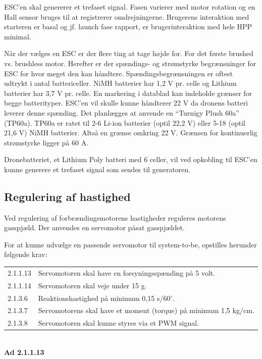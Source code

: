 ESC'en skal genererer et trefaset signal. Fasen varierer med motor rotation og en Hall sensor bruges til at registrerer omdrejningerne. Brugerens interaktion med starteren er basal og jf. launch fase rapport, er brugerinteraktion med hele HPP minimal.

Når der vælges en ESC er der flere ting at tage højde for. For det første brushed vs. brushless motor. Herefter er der spændings- og strømstyrke begrænsninger for ESC for hvor meget den kan håndtere. Spændingsbegrænsningen er oftest udtrykt i antal battericeller. NiMH batterier har 1,2 V pr. celle og Lithium batterier har 3,7 V pr. celle. En markering i datablad kan indeholde grænser for begge batterityper. ESC'en vil skulle kunne håndterer 22 V da dronens batteri leverer denne spænding. Det planlægges at anvende  en ``Turnigy Plush 60a'' (TP60a). TP60a er ratet til 2-6 Li-ion batterier (optil 22,2 V) eller 5-18 (optil 21,6 V) NiMH batterier. Altså en grænse omkring 22 V. Grænsen for kontinuerlig strømstyrke ligger på 60 A.

Dronebatteriet, et Lithium Poly batteri med 6 celler, vil ved opkobling til ESC'en kunne generere et trefaset signal som sendes til generatoren.

\subsection{Regulering af hastighed}
\label{sec:regul-af-hast}

Ved regulering af forbrændingsmotorens hastigheder reguleres motorens gasspjæld. Der anvendes en servomotor påsat gasspjældet.

For at kunne udvælge en passende servomotor til system-to-be, opstilles herunder følgende krav:
\vspace{1em}
\begin{tabular}[h]{ll}
2.1.1.13&Servomotoren skal have en forsyningsspænding på 5 volt.\vspace{0.5em}\\
2.1.1.14&Servomotoren skal veje under 15 g.\vspace{0.5em}\\
2.1.3.6 &Reaktionshastighed på minimum 0,15 s/60$^\circ$.\vspace{0.5em}\\
2.1.3.7& Servomotorens skal have et moment (torque) på minimum 1,5 kg/cm.\vspace{0.5em}\\
2.1.3.8& Servomotoren skal kunne styres via et PWM signal.\vspace{0.5em}\\ 
\end{tabular}
\vspace{1em}\\
\noindent \textbf{Ad 2.1.1.13}

